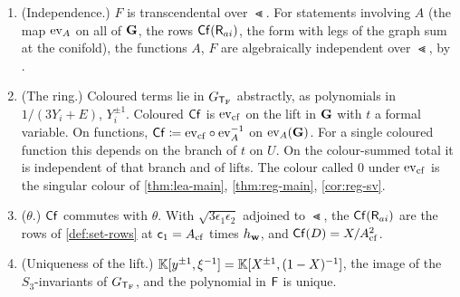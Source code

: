 \begin{lem}
\label{lem:fra-cfwell}
\begin{enumerate}
\item \textup{(Independence.)} $F$ is transcendental over $\Lt$. For statements involving $A$ (the map $\mathrm{ev}_{A}$ on all of $\mathbf{G}$, the rows $\mathsf{Cf}(\mathsf{R}_{ai})$, the form with legs of the graph sum at the conifold), the functions $A$, $F$ are algebraically independent over $\Lt$, by \cite[Lemma~4.2]{BFGW21}.
\item \textup{(The ring.)} Coloured terms lie in $G_{\mathsf{T}_{\mathrm{F}}}$ abstractly, as polynomials in $1/(3Y_i+E)$, $Y_i^{\pm1}$. Coloured $\mathsf{Cf}$ is $\mathrm{ev}_{\mathrm{cf}}$ on the lift in $\mathbf{G}$ with $t$ a formal variable. On functions, $\mathsf{Cf}\coloneqq\mathrm{ev}_{\mathrm{cf}}\circ\mathrm{ev}_{A}^{-1}$ on $\mathrm{ev}_{A}(\mathbf{G})$. For a single coloured function this depends on the branch of $t$ on $U$. On the colour-summed total it is independent of that branch and of lifts. The colour called $0$ under $\mathrm{ev}_{\mathrm{cf}}$ is the singular colour of \cref{thm:lea-main}, \cref{thm:reg-main}, \cref{cor:reg-sv}.
\item \textup{($\theta$.)} $\mathsf{Cf}$ commutes with $\theta$. With $\sqrt{3\epsilon_1\epsilon_2}$ adjoined to $\Lt$, the $\mathsf{Cf}(\mathsf{R}_{ai})$ are the rows of \cref{def:set-rows} at $\mathsf{c}_{1}=A_{\mathrm{cf}}$ times $h_{\mathbf{w}}$, and $\mathsf{Cf}(D)=X/A_{\mathrm{cf}}^2$.
\item \textup{(Uniqueness of the lift.)} $\mathbb{K}[y^{\pm1},\xi^{-1}]=\mathbb{K}[X^{\pm1},(1-X)^{-1}]$, the image of the $S_3$-invariants of $G_{\mathsf{T}_{\mathrm{F}}}$, and the polynomial in $\mathsf{F}$ is unique.
\end{enumerate}
\end{lem}

